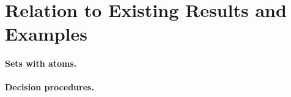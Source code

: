 \section{Relation to Existing Results and Examples}
\label{sec:examples}


\paragraph{Sets with atoms.}


\paragraph{Decision procedures.}


